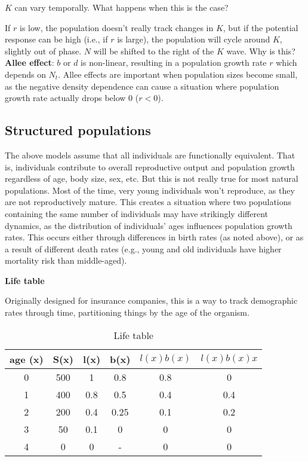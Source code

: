 \documentclass[12pt]{article}
\begin{document}
\bigskip

$K$ can vary temporally. What happens when this is the case? 

If $r$ is low, the population doesn't really track changes in $K$, but if the potential response can be high (i.e., if $r$ is large), the population will cycle around $K$, slightly out of phase. $N$ will be shifted to the right of the $K$ wave. Why is this? \\





\textbf{Allee effect}: $b$ or $d$ is non-linear, resulting in a population growth rate $r$ which depends on $N_{t}$. Allee effects are important when population sizes become small, as the negative density dependence can cause a situation where population growth rate actually drops below 0 ($r < 0$). 





\clearpage



\subsection*{Structured populations}

The above models assume that all individuals are functionally equivalent. That is, individuals contribute to overall reproductive output and population growth regardless of age, body size, sex, etc. But this is not really true for most natural populations. Most of the time, very young individuals won't reproduce, as they are not reproductively mature. This creates a situation where two populations containing the same number of individuals may have strikingly different dynamics, as the distribution of individuals' ages influences population growth rates. This occurs either through differences in birth rates (as noted above), or as a result of different death rates (e.g., young and old individuals have higher mortality risk than middle-aged).


\textbf{Life table}

Originally designed for insurance companies, this is a way to track demographic rates through time, partitioning things by the age of the organism. 



\begin{table}[h!]
\centering
\caption{Life table}
\vspace{0.5cm}
\begin{tabular}{cccccc}
\hline
age (x) & S(x) & l(x) & b(x) & $l(x)b(x)$ & $l(x)b(x)x$ \\
\hline
0 & 500 & 1   & 0.8  & 0.8 & 0   \\
1 & 400 & 0.8 & 0.5  & 0.4 & 0.4 \\
2 & 200 & 0.4 & 0.25 & 0.1 & 0.2 \\
3 & 50  & 0.1 & 0    & 0  &  0 \\
4 & 0   & 0   & -    & 0  &  0 \\
\hline
\end{tabular}
\end{table}
\end{document}
